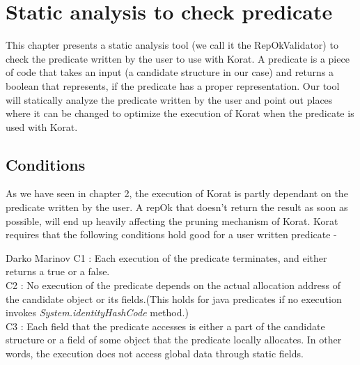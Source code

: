 \chapter{Static analysis to check predicate}
\label{ch:static-analysis}
This chapter presents a static analysis tool (we call it the RepOkValidator) to check the predicate written by the user to use with Korat. A predicate is a piece of code that takes an input (a candidate structure in our case) and returns a boolean that represents, if the predicate has a proper representation. Our tool will statically analyze the predicate written by the user and point out places where it can be changed to optimize the execution of Korat when the predicate is used with Korat.

\section{Conditions}
As we have seen in chapter 2, the execution of Korat is partly dependant on the predicate written by the user. A repOk that doesn’t return the result as soon as possible, will end up heavily affecting the pruning mechanism of Korat. Korat requires\cite{marinov2005automatic} that the following conditions hold good for a user written predicate - 

\begin{aquote}{Darko Marinov}
C1 : Each execution of the predicate terminates, and either returns a true or a false.\\
C2 : No execution of the predicate depends on the actual allocation address of the candidate object or its fields.(This holds for java predicates if no execution invokes \emph{System.identityHashCode} method.)\\
C3 : Each field that the predicate accesses is either a part of the candidate structure or a field of some object that the predicate locally allocates. In other words, the execution does not access global data through static fields.\\
\end{aquote}

